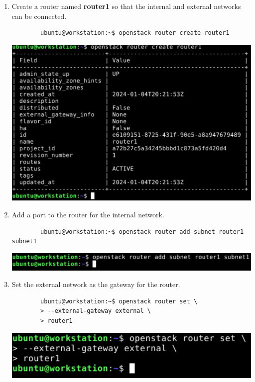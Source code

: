 \documentclass[letterpaper, 12pt]{article}
\begin{document}
\begin{enumerate}
    \item Create a router named \textbf{router1} so that the internal and external networks can be connected.
    \begin{lstlisting}
        ubuntu@workstation:~$ openstack router create router1
    \end{lstlisting}

    \begin{center}
        \includegraphics[width=\linewidth]{images/part1/step24.png}
    \end{center}

    \item Add a port to the router for the internal network.
    \begin{lstlisting}
        ubuntu@workstation:~$ openstack router add subnet router1 subnet1
    \end{lstlisting}

    \begin{center}
        \includegraphics[width=\linewidth]{images/part1/step25.png}
    \end{center}

    \item Set the external network as the gateway for the router.
    \begin{lstlisting}
        ubuntu@workstation:~$ openstack router set \
        > --external-gateway external \
        > router1
    \end{lstlisting}

    \begin{center}
        \includegraphics[width=\linewidth]{images/part1/step26.png}
    \end{center}


\end{enumerate}
\end{document}
